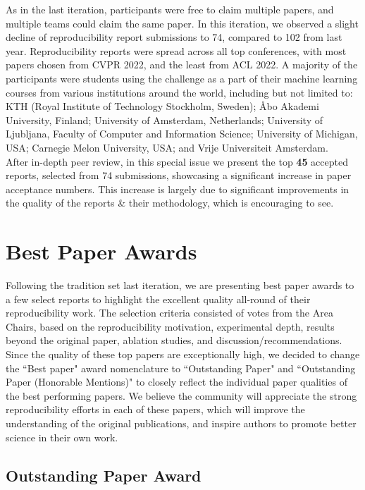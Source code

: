 As in the last iteration, participants were free to claim multiple papers, and multiple teams could claim the same paper. In this iteration, we observed a slight decline of reproducibility report submissions to 74, compared to 102 from last year. Reproducibility reports were spread across all top conferences, with most papers chosen from CVPR 2022, and the least from ACL 2022. A majority of the participants were students using the challenge as a part of their machine learning courses from various institutions around the world, including but not limited to: KTH (Royal Institute of Technology Stockholm, Sweden); Åbo Akademi University, Finland; University of Amsterdam, Netherlands; University of Ljubljana, Faculty of Computer and Information Science; University of Michigan, USA; Carnegie Melon University, USA; and Vrije Universiteit Amsterdam.
\\
After in-depth peer review, in this special issue we present the top \textbf{45} accepted reports, selected from 74 submissions, showcasing a significant increase in paper acceptance numbers. This increase is largely due to significant improvements in the quality of the reports \& their methodology, which is encouraging to see.

\section{Best Paper Awards}

Following the tradition set last iteration, we are presenting best paper awards to a few select reports to highlight the excellent quality all-round of their reproducibility work. The selection criteria consisted of votes from the Area Chairs, based on the reproducibility motivation, experimental depth, results beyond the original paper, ablation studies, and discussion/recommendations. Since the quality of these top papers are exceptionally high, we decided to change the ``Best paper" award nomenclature to ``Outstanding Paper" and ``Outstanding Paper (Honorable Mentions)" to closely reflect the individual paper qualities of the best performing papers.
We believe the community will appreciate the strong reproducibility efforts in each of these papers, which will improve the understanding of the original publications, and inspire authors to promote better science in their own work.


\subsection{Outstanding Paper Award}

